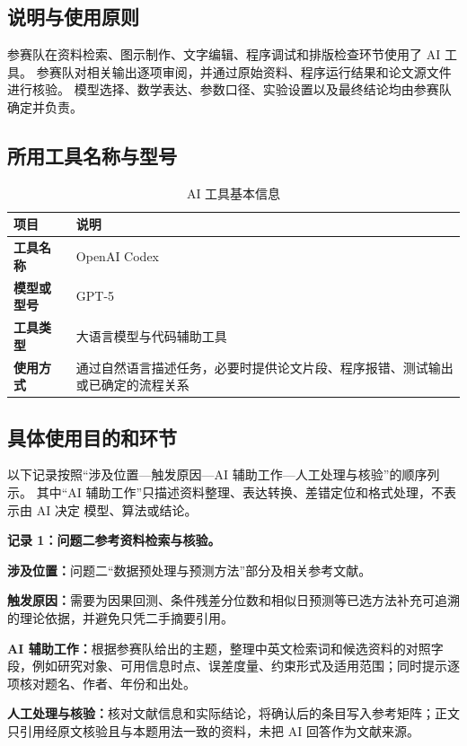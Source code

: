 \documentclass[withoutpreface,bwprint]{cumcmthesis}
\begin{document}
\subsection{说明与使用原则}

参赛队在资料检索、图示制作、文字编辑、程序调试和排版检查环节使用了 AI 工具。
参赛队对相关输出逐项审阅，并通过原始资料、程序运行结果和论文源文件进行核验。
模型选择、数学表达、参数口径、实验设置以及最终结论均由参赛队确定并负责。

\subsection{所用工具名称与型号}

\begin{table}[H]
  \centering
  \caption{AI 工具基本信息}
  \begin{tabular}{>{\bfseries}p{3.5cm}p{10.2cm}}
    \toprule
    项目 & 说明 \\
    \midrule
    工具名称 & OpenAI Codex \\
    模型或型号 & GPT-5 \\
    工具类型 & 大语言模型与代码辅助工具 \\
    使用方式 & 通过自然语言描述任务，必要时提供论文片段、程序报错、测试输出或已确定的流程关系 \\
    \bottomrule
  \end{tabular}
\end{table}

\subsection{具体使用目的和环节}

以下记录按照“涉及位置---触发原因---AI 辅助工作---人工处理与核验”的顺序列示。
其中“AI 辅助工作”只描述资料整理、表达转换、差错定位和格式处理，不表示由 AI 决定
模型、算法或结论。

\par\medskip\noindent\textbf{记录 1：问题二参考资料检索与核验。}\par
\par\noindent\textbf{涉及位置：}问题二“数据预处理与预测方法”部分及相关参考文献。
\par\noindent\textbf{触发原因：}需要为因果回测、条件残差分位数和相似日预测等已选方法补充可追溯的理论依据，并避免只凭二手摘要引用。
\par\noindent\textbf{AI 辅助工作：}根据参赛队给出的主题，整理中英文检索词和候选资料的对照字段，例如研究对象、可用信息时点、误差度量、约束形式及适用范围；同时提示逐项核对题名、作者、年份和出处。
\par\noindent\textbf{人工处理与核验：}核对文献信息和实际结论，将确认后的条目写入参考矩阵；正文只引用经原文核验且与本题用法一致的资料，未把 AI 回答作为文献来源。
\end{document}
